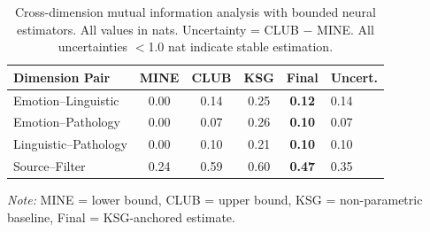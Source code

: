 \begin{table}[t]
\centering
\caption{Cross-dimension mutual information analysis with bounded neural estimators. All values in nats. Uncertainty = CLUB $-$ MINE. All uncertainties $<$1.0 nat indicate stable estimation.}
\label{tab:mi_results}
\begin{tabular}{lccccl}
\toprule
\textbf{Dimension Pair} & \textbf{MINE} & \textbf{CLUB} & \textbf{KSG} & \textbf{Final} & \textbf{Uncert.} \\
\midrule
Emotion--Linguistic & 0.00 & 0.14 & 0.25 & \textbf{0.12} & 0.14 \\
Emotion--Pathology & 0.00 & 0.07 & 0.26 & \textbf{0.10} & 0.07 \\
Linguistic--Pathology & 0.00 & 0.10 & 0.21 & \textbf{0.10} & 0.10 \\
Source--Filter & 0.24 & 0.59 & 0.60 & \textbf{0.47} & 0.35 \\
\bottomrule
\end{tabular}
\vspace{1mm}
\small\textit{Note:} MINE = lower bound, CLUB = upper bound, KSG = non-parametric baseline, Final = KSG-anchored estimate.
\end{table}
